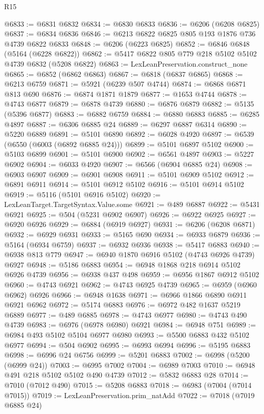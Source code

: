 \begin{lexlean}{R15}
\begin{coremodule}
{{{{{{{{{{{@6833 := @6831 @6832
@6834 := @6830 @6833
@6836 := @6206 (@6208 @6825)
@6837 := @6834 @6836
@6846 := @6213 @6822 @6825 @805 @193 @1876 @736 @4739 @6822 @6833
@6848 := @6206 (@6223 @6825)
@6852 := @6846 @6848 (@5164 (@6228 @6822))
@6862 := @5417 @6822 @805 @779 @218 @5102 @5102 @4739 @6832 (@5208 @6822)
@6863 := LexLeanPreservation.construct_none
@6865 := @6852 (@6862 @6863)
@6867 := @6818 (@6837 @6865)
@6868 := @6213 @6759
@6871 := @5921 (@6239 @507 @4744)
@6874 := @6868 @6871 @813 @690
@6876 := @6874 @1871 @1879
@6877 := @1653 @4744
@6878 := @4743 @6877
@6879 := @6878 @4739
@6880 := @6876 @6879
@6882 := @5135 (@5396 @6877)
@6883 := @6882 @6759
@6884 := @6880 @6883
@6885 := @6285 @4897
@6887 := @6306 @6885 @24
@6889 := @6297 @6887 @6314
@6890 := @5220 @6889
@6891 := @5101 @6890
@6892 := @6028 @4920
@6897 := @6539 (@6550 (@6003 (@6892 @6885 @24)))
@6899 := @5101 @6897 @5102
@6900 := @5103 @6899
@6901 := @5101 @6900
@6902 := @6561 @4897
@6903 := @5227 @6902
@6904 := @6033 @4920
@6907 := @6566 (@6904 @6885 @24)
@6908 := @6903 @6907
@6909 := @6901 @6908
@6911 := @5101 @6909 @5102
@6912 := @6891 @6911
@6914 := @5101 @6912 @5102
@6916 := @5101 @6914 @5102
@6919 := @5116 (@5101 @6916 @5102)
@6920 := LexLeanTarget.TargetSyntax.Value.some
@6921 := @489 @6887
@6922 := @5431 @6921
@6925 := @504 (@5231 @6902 @6907)
@6926 := @6922 @6925
@6927 := @6920 @6926
@6929 := @6884 (@6919 @6927)
@6931 := @6206 (@6208 @6871)
@6932 := @6929 @6931
@6933 := @5165 @690
@6934 := @6933 @6879
@6936 := @5164 (@6934 @6759)
@6937 := @6932 @6936
@6938 := @5417 @6883
@6940 := @6938 @813 @779
@6947 := @6940 @1870 @6916 @5102 (@4743 @6926 @4739) @6927
@6948 := @5186 @6883
@6954 := @6948 @1868 @218 @6914 @5102 @6926 @4739
@6956 := @6938 @437 @498
@6959 := @6956 @1867 @6912 @5102
@6960 := @4743 @6921
@6962 := @4743 @6925 @4739
@6965 := @6959 (@6960 @6962) @6926
@6966 := @6948 @1638
@6971 := @6966 @1866 @6890 @6911 @6921 @6962
@6972 := @5174 @6883
@6976 := @6972 @482 @1637 @5219 @6889
@6977 := @489 @6885
@6978 := @4743 @6977
@6980 := @4743 @490 @4739
@6983 := @6976 (@6978 @6980) @6921
@6984 := @6948 @751
@6989 := @6984 @493 @5102 @5104 @6977 @6980
@6993 := @5500 @6883 @432 @5102 @6977
@6994 := @504 @6902
@6995 := @6993 @6994
@6996 := @5195 @6883
@6998 := @6996 @24 @6756
@6999 := @5201 @6883
@7002 := @6998 (@5200 (@6999 @24))
@7003 := @6995 @7002
@7004 := @6989 @7003
@7010 := @6948 @491 @218 @5102 @5102 @490 @4739
@7012 := @5832 @6883 @28
@7014 := @7010 (@7012 @490)
@7015 := @5208 @6883
@7018 := @6983 (@7004 (@7014 @7015))
@7019 := LexLeanPreservation.prim_natAdd
@7022 := @7018 (@7019 @6885 @24)
}}}}}}}}}}}
\end{coremodule}
\end{lexlean}
